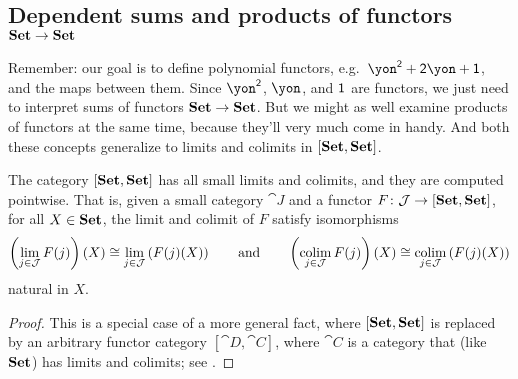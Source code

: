 \documentclass[Book-Poly]{subfiles}
\begin{document}
\subsection{Dependent sums and products of functors $\mathbf{Set}\to\mathbf{Set}$} \label{subsec.poly.func_nat.repr_sum.dep_sum_prod_func}

Remember: our goal is to define polynomial functors, e.g.\ $\yon^\2+\2\yon+\1$, and the maps between them. Since $\yon^\2$, $\yon$, and $\textsf{1}$ are functors, we just need to interpret sums of functors $\mathbf{Set}\to\mathbf{Set}$.
But we might as well examine products of functors at the same time, because they'll very much come in handy.
And both these concepts generalize to limits and colimits in $[\mathbf{Set},\mathbf{Set}]$.

\begin{proposition} \label{prop.presheaf_lim_ptwise}
The category $[\mathbf{Set},\mathbf{Set}]$ has all small limits and colimits, and they are computed pointwise.
That is, given a small category $\cat{J}$ and a functor $F\colon \mathcal{J}\to[\mathbf{Set},\mathbf{Set}]$, for all $X\in\mathbf{Set}$, the limit and colimit of $F$ satisfy isomorphisms
\[
    \left(\lim_{j\in\mathcal{J}} F(j)\right)(X) \cong \lim_{j\in\mathcal{J}} \left(F(j)(X)\right) \qquad\text{and}\qquad \left(\operatorname*{colim}_{j\in\mathcal{J}} F(j)\right)(X) \cong \operatorname*{colim}_{j\in\mathcal{J}} \left(F(j)(X)\right)
\]
natural in $X$.
\end{proposition}
\begin{proof}
This is a special case of a more general fact, where $[\mathbf{Set},\mathbf{Set}]$ is replaced by an arbitrary functor category $[\cat{D},\cat{C}]$, where $\cat{C}$ is a category that (like $\mathbf{Set}$) has limits and colimits; see \cite[pages 22 -- 23, displays (24) and (25)]{macLane1992sheaves}.
\end{proof}
\end{document}
